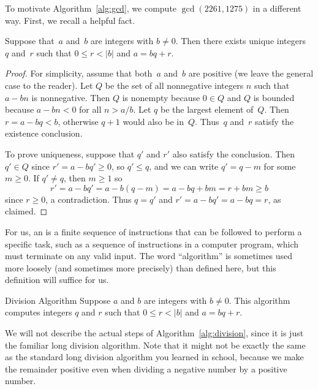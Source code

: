 To motivate Algorithm~\ref{alg:gcd}, we compute $\gcd(2261,1275)$ in
a different way.  First, we recall a helpful fact.
\begin{proposition}\label{prop:division}
  Suppose that~$a$ and~$b$ are integers with $b\neq 0$.  Then there
  exists unique integers~$q$ and~$r$ such that $0\leq r< |b|$ and $a =
  bq + r$.
\end{proposition}
\begin{proof}
  For simplicity, assume that both~$a$ and~$b$ are positive (we leave
  the general case to the reader). Let $Q$ be the set of all
  nonnegative integers $n$ such that $a-bn$ is nonnegative.  Then $Q$
  is nonempty because $0\in Q$ and $Q$ is bounded because $a-bn<0$ for
  all $n>a/b$.  Let $q$ be the largest element of~$Q$.  Then $r=a-bq <
  b$, otherwise $q+1$ would also be in~$Q$.  Thus~$q$ and~$r$ satisfy
  the existence conclusion.

  To prove uniqueness, suppose that $q'$ and $r'$ also satisfy the
  conclusion.  Then $q'\in Q$ since $r'=a-bq'\geq 0$, so $q'\leq q$,
  and we can write $q'=q-m$ for some $m\geq 0$.  If $q'\neq q$, then
  $m\geq 1$ so $$r' = a-bq' = a-b(q-m) = a-bq + bm = r + bm \geq b$$ since
  $r \geq 0$, a contradiction.  Thus $q=q'$ and $r'=a-bq'=a-bq=r$, as
  claimed.
\end{proof}

For us, an  is a finite sequence of instructions that
can be followed to perform a specific task, such as a sequence of
instructions in a computer program, which must terminate on
any valid input.  The word ``algorithm'' is sometimes used more
loosely (and sometimes more precisely) than defined here, but this
definition will suffice for us.

\begin{algorithm}{Division Algorithm}\label{alg:division}%
  Suppose $a$ and $b$ are integers with $b\neq 0$. This algorithm
computes integers $q$ and $r$ such that $0\leq r<|b|$ and
$a=bq+r$.
\end{algorithm}
We will not describe the actual steps of Algorithm~\ref{alg:division},
since it is just the familiar long division algorithm.  Note that it
might not be exactly the same as the standard long division algorithm
you learned in school, because we make the remainder positive even
when dividing a negative number by a positive number.

